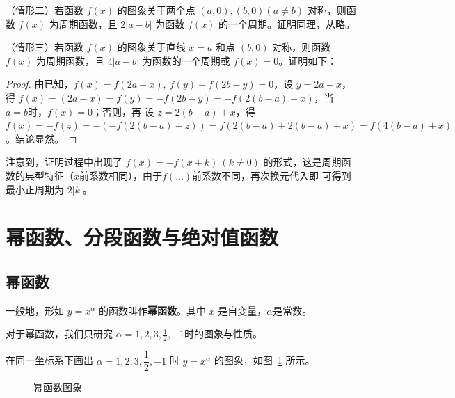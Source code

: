 \documentclass[a4paper,openany]{ctexbook}
\begin{document}
（情形二）若函数 \(f(x)\) 的图象关于两个点 \((a,0),(b,0)(a \ne b)\) 对称，则函数 \(f(x)\) 为周期函数，且 \(2|a-b|\) 为函数 \(f(x)\) 的一个周期。证明同理，从略。

（情形三）若函数 \(f(x)\) 的图象关于直线 \(x=a\) 和点 \((b,0)\) 对称，则函数 \(f(x)\) 为周期函数，且 \(4|a-b|\) 为函数的一个周期或 \(f(x)=0\)。证明如下：

\begin{proof}
    由已知，\(f(x)=f(2a-x),\ f(y)+f(2b-y)=0\)，设 \(y=2a-x\)，得 \(f(x)=(2a-x)=f(y)=-f(2b-y)=-f(2(b-a)+x)\)，当 \(a=b\)时，\(f(x)=0\)；否则，再
    设 \(z=2(b-a)+x\)，得 \(f(x)=-f(z)=-(-f(2(b-a)+z))=f(2(b-a)+2(b-a)+x)=f(4(b-a)+x)\)。结论显然。
\end{proof}

注意到，证明过程中出现了 \(f(x)=-f(x+k)\ (k\ne 0)\) 的形式，这是周期函数的典型特征（\(x\)前系数相同），由于\(f(\dots)\)前系数不同，再次换元代入即
可得到最小正周期为 \(2|k|\)。

\section{幂函数、分段函数与绝对值函数}

\subsection{幂函数}

一般地，形如 \(y=x^\alpha\) 的函数叫作\textbf{幂函数}。其中 \(x\) 是自变量，\(\alpha\)是常数。

对于幂函数，我们只研究 \(\alpha=1,2,3,\frac{1}{2},-1\)时的图象与性质。

在同一坐标系下画出 \(\alpha=1,2,3,\dfrac{1}{2},-1\) 时 \(y=x^\alpha\) 的图象，如图~\ref{fgr:mihjuutuxl} 所示。

\begin{figure}
    \centering
    \caption{幂函数图象}\label{fgr:mihjuutuxl}
\end{figure}
\end{document}
